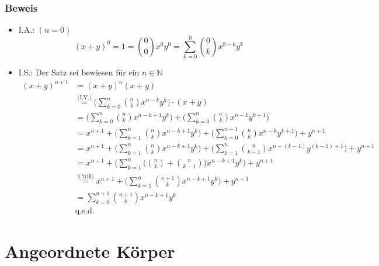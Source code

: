 \subsubsection{Beweis}
\begin{itemize}
\item I.A.: \((n=0)\)
\[
(x+y)^0 = 1 = \binom{0}{0} x^0 y^0 = \sum \limits_{k=0}^{0} \binom{0}{k} x^{0-k} y^k
\]
\item I.S.: Der Satz sei bewiesen für ein \(n \in \mathbb{N}\)
\begin{align*}
(x+y)^{n+1} &= (x+y)^n (x+y) \\
&\overset{\text{(I.V.)}}{=} \bigg( \sum \limits_{k=0}^{n} \binom{n}{k} x^{n-k} y^k\bigg) \cdot (x+y) \\
&= \bigg( \sum \limits_{k=0}^{n} \binom{n}{k} x^{n-k+1} y^k\bigg) + \bigg( \sum \limits_{k=0}^{n} \binom{n}{k} x^{n-k} y^{k+1}\bigg) \\
&= x^{n+1} + \bigg( \sum \limits_{k=1}^{n} \binom{n}{k} x^{n-k+1} y^k\bigg) + \bigg( \sum \limits_{k=0}^{n-1} \binom{n}{k} x^{n-k} y^{k+1}\bigg) + y^{n+1} \\
&= x^{n+1} + \bigg( \sum \limits_{k=1}^{n} \binom{n}{k} x^{n-k+1} y^k\bigg) + \bigg( \sum \limits_{k=1}^{n} \binom{n}{k-1} x^{n-(k-1)} y^{(k-1)+1}\bigg) + y^{n+1} \\
&= x^{n+1} + \Bigg( \sum \limits_{k=1}^{n} \bigg( \binom{n}{k} + \binom{n}{k-1} \bigg)x^{n-k+1} y^k\Bigg) + y^{n+1} \\
&\overset{\text{1.7(iii)}}{=} x^{n+1} + \bigg( \sum \limits_{k=1}^{n} \binom{n+1}{k} x^{n-k+1} y^k\bigg) + y^{n+1} \\
&= \sum \limits_{k=0}^{n+1} \binom{n+1}{k} x^{n-k+1} y^k \\
&\text{q.e.d.}
\end{align*}
\end{itemize}

\section{Angeordnete Körper}
